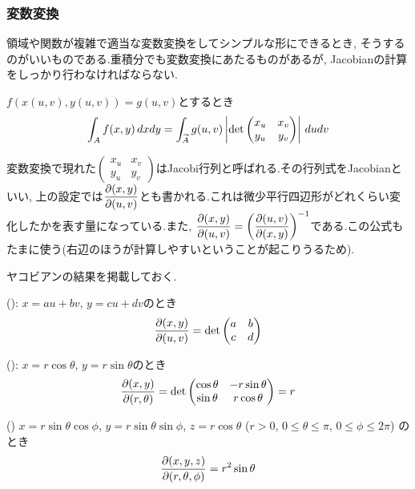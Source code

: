 \subsubsection{変数変換}
領域や関数が複雑で適当な変数変換をしてシンプルな形にできるとき, そうするのがいいものである.重積分でも変数変換にあたるものがあるが, Jacobianの計算をしっかり行わなければならない.
\begin{theo}
$f(x(u,v), y(u,v)) = g(u,v)$とするとき
\[\displaystyle\int_{A} f(x,y)\, dxdy
= \displaystyle\int_{\widetilde{A}} g(u,v)
\left| \det{
\begin{pmatrix}
x_u & x_v\\
y_u & y_v
\end{pmatrix}
}
 \right|\, dudv \]
\end{theo}
変数変換で現れた$\begin{pmatrix}
x_u & x_v\\
y_u & y_v
\end{pmatrix}$はJacobi行列と呼ばれる.その行列式をJacobianといい, 上の設定では$\dfrac{\partial(x,y)}{\partial(u,v)}$とも書かれる.これは微少平行四辺形がどれくらい変化したかを表す量になっている.また, $\dfrac{\partial(x,y)}{\partial(u,v)} = \left( \dfrac{\partial(u,v)}{\partial(x,y)} \right)^{-1}$である.この公式もたまに使う(右辺のほうが計算しやすいということが起こりうるため).
\begin{tips}
ヤコビアンの結果を掲載しておく.
\ben
\item (): $x=au + bv$, $y=cu + dv$のとき
\[\dfrac{\partial(x,y)}{\partial(u,v)} = \det{\begin{pmatrix} a & b \\ c & d \end{pmatrix}}\]
\item (): $x=r\cos{\theta}$, $y=r\sin{\theta}$のとき
\[\dfrac{\partial(x,y)}{\partial(r,\theta)}
= \det{
\begin{pmatrix}
\cos{\theta} & -r\sin{\theta}\\
\sin{\theta} & r\cos{\theta}
\end{pmatrix}
}
=
r
\]
\item () $x=r\sin{\theta}\cos{\phi}$, $y=r\sin{\theta} \sin{\phi}$, $z=r\cos{\theta}$ ($r>0$, $0\leq \theta \leq \pi$, $0\leq \phi \leq 2\pi$) のとき
\[\dfrac{\partial(x,y,z)}{\partial(r,\theta,\phi)} = r^2\sin{\theta}\]
\een
\end{tips}

